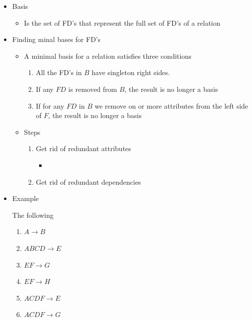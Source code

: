 \documentclass[12pt]{article}
\begin{document}
\begin{enumerate}[1.]
        \begin{itemize}
            \item Basis
            \begin{itemize}
                \item Is the set of FD's that represent the full set of FD's of a relation
            \end{itemize}
            \item Finding minal bases for FD's
            \begin{itemize}
                \item A minimal basis for a relation satisfies three conditions
                \begin{enumerate}[1.]
                    \item All the FD's in $B$ have singleton right sides.
                    \item If any $FD$ is removed from $B$, the result is no longer a basis
                    \item If for any $FD$ in $B$ we remove on or more attributes from
                    the left side of $F$, the result is no longer a basis
                \end{enumerate}
                \item Steps
                \begin{enumerate}[1.]
                    \item Get rid of redundant attributes
                    \begin{itemize}
                        \item
                    \end{itemize}
                    \item Get rid of redundant dependencies
                \end{enumerate}
            \end{itemize}
            \item Example

            \bigskip

            The following

            \begin{enumerate}[1.]
                \item $A \to B$
                \item $ABCD \to E$
                \item $EF \to G$
                \item $EF \to H$
                \item $ACDF \to E$
                \item $ACDF \to G$
            \end{enumerate}


\end{itemize}
\end{enumerate}
\end{document}
